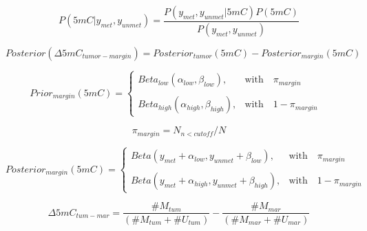 \documentclass[a4paper]{article}
\begin{document}

\begin{equation*}
P(5mC | y_{met}, y_{unmet}) = \frac{ P(y_{met}, y_{unmet} | 5mC) P(5mC)} { P(y_{met}, y_{unmet}) }
\end{equation*}

\newpage
\begin{equation*}
Posterior(\Delta 5mC_{tumor - margin}) = Posterior_{tumor}(5mC) - Posterior_{margin}(5mC)
\end{equation*}

\newpage
\begin{equation*}
Prior_{margin}(5mC) = 
\begin{cases} 
Beta_{low}(\alpha_{low}, \beta_{low}), & \mbox{with } \mbox{ $\pi_{margin}$ } \\
\\
Beta_{high}(\alpha_{high}, \beta_{high}), & \mbox{with } \mbox{ $1 - \pi_{margin}$ }
\end{cases}
\end{equation*}

\begin{equation*}
\pi_{margin} = N_{n < cutoff} / N
\end{equation*}

\newpage

\begin{equation*}
Posterior_{margin}(5mC) = 
\begin{cases} 
Beta(y_{met} + \alpha_{low}, y_{unmet} + \beta_{low}) , & \mbox{with } \mbox{ $\pi_{margin}$ } \\
\\
Beta(y_{met} + \alpha_{high}, y_{unmet} + \beta_{high}), & \mbox{with } \mbox{ $1 - \pi_{margin}$ }
\end{cases}
\end{equation*}


\newpage
\begin{equation*}
\Delta 5mC_{tum - mar} = \frac{\#M_{tum}}{(\#M_{tum} + \#U_{tum})} - 
    \frac{\#M_{mar}}{(\#M_{mar} + \#U_{mar})}
\end{equation*}
\end{document}
